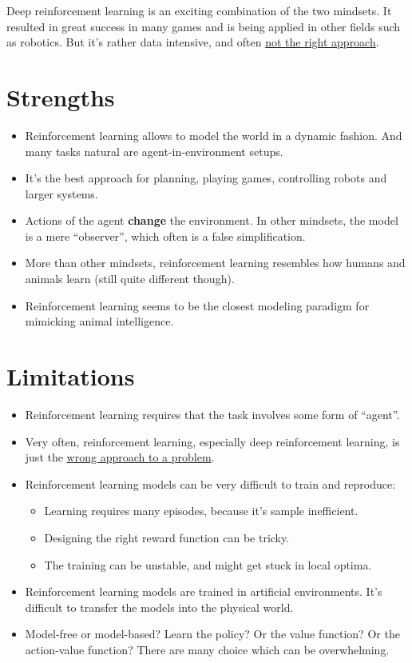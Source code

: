 \documentclass[
  10pt,
]{scrbook}
\providecommand{\tightlist}{%
  \setlength{\itemsep}{0pt}\setlength{\parskip}{0pt}}
\begin{document}
Deep reinforcement learning is an exciting combination of the two mindsets.
It resulted in great success in many games and is being applied in other fields such as robotics.
But it's rather data intensive, and often \href{https://www.alexirpan.com/2018/02/14/rl-hard.html}{not the right approach}.

\hypertarget{strengths-8}{%
\section{Strengths}\label{strengths-8}}

\begin{itemize}
\tightlist
\item
  Reinforcement learning allows to model the world in a dynamic fashion. And many tasks natural are agent-in-environment setups.
\item
  It's the best approach for planning, playing games, controlling robots and larger systems.
\item
  Actions of the agent \textbf{change} the environment. In other mindsets, the model is a mere ``observer'', which often is a false simplification.
\item
  More than other mindsets, reinforcement learning resembles how humans and animals learn (still quite different though).
\item
  Reinforcement learning seems to be the closest modeling paradigm for mimicking animal intelligence.
\end{itemize}

\hypertarget{limitations-8}{%
\section{Limitations}\label{limitations-8}}

\begin{itemize}
\tightlist
\item
  Reinforcement learning requires that the task involves some form of ``agent''.
\item
  Very often, reinforcement learning, especially deep reinforcement learning, is just the \href{https://www.alexirpan.com/2018/02/14/rl-hard.html}{wrong approach to a problem}.
\item
  Reinforcement learning models can be very difficult to train and reproduce:

  \begin{itemize}
  \tightlist
  \item
    Learning requires many episodes, because it's sample inefficient.
  \item
    Designing the right reward function can be tricky.
  \item
    The training can be unstable, and might get stuck in local optima.
  \end{itemize}
\item
  Reinforcement learning models are trained in artificial environments. It's difficult to transfer the models into the physical world.
\item
  Model-free or model-based? Learn the policy? Or the value function? Or the action-value function? There are many choice which can be overwhelming.
\end{itemize}
\end{document}

